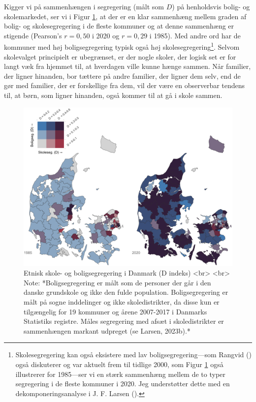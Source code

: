 \documentclass[
]{book}
\begin{document}
Kigger vi på sammenhængen i segregering (målt som \(D\)) på henholdsvis bolig- og skolemarkedet, ser vi i Figur \ref{fig:fig-3-4}, at der er en klar sammenhæng mellem graden af bolig- og skolesegregering i de fleste kommuner og at denne sammenhæng er stigende (Pearson's \(r=0,50\) i 2020 og \(r=0,29\) i 1985). Med andre ord har de kommuner med høj boligsegregering typisk også høj skolesegregering\footnote{Skolesegregering kan også eksistere med lav boligsegregering---som Rangvid () også diskuterer og var aktuelt frem til tidlige 2000, som Figur \ref{fig:fig-3-4} også illustrerer for 1985---ser vi en stærk sammenhæng mellem de to typer segregering i de fleste kommuner i 2020. Jeg understøtter dette med en dekomponeringsanalyse i J. F. Larsen ().}. Selvom skolevalget principielt er ubegrænset, er der nogle skoler, der logisk set er for langt væk fra hjemmet til, at hverdagen ville kunne hænge sammen. Når familier, der ligner hinanden, bor tættere på andre familier, der ligner dem selv, end de gør med familier, der er forskellige fra dem, vil der være en observerbar tendens til, at børn, som ligner hinanden, også kommer til at gå i skole sammen.

\begin{figure}
\includegraphics[width=1\linewidth]{images/Figur5} \caption{Etnisk skole- og boligsegregering i Danmark (D indeks) <br> <br> Note: *Boligsegregering er målt som de personer der går i den danske grundskole og ikke den fulde population. Boligsegregering er målt på sogne inddelinger og ikke skoledistrikter, da disse kun er tilgængelig for 19 kommuner og årene 2007-2017 i Danmarks Statistiks registre. Måles segregering med afsæt i skoledistrikter er sammenhængen markant udpreget (se Larsen, 2023b).*}\label{fig:fig-3-4}
\end{figure}
\end{document}
